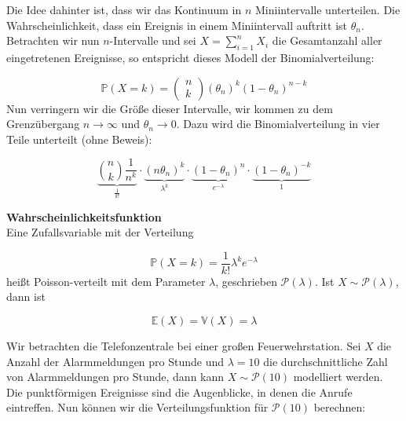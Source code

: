 {    Die Idee dahinter ist, dass wir das
    Kontinuum in $n$ Miniintervalle unterteilen. Die Wahrscheinlichkeit, dass
    ein Ereignis in einem Miniintervall auftritt ist
    $\theta_{n}$. Betrachten wir nun $n$-Intervalle und sei $X=\sum_{i=1}^{n}X_{i}$ 
    die Gesamtanzahl aller eingetretenen Ereignisse, so entspricht dieses Modell der Binomialverteilung:

    \[\mathbb P\left(X=k\right)=
        \left(\begin{matrix}n\\k\end{matrix}\right)\left(\theta_{n}\right)^{k}\left(1-\theta _{n}\right)^{n-k}
    \]
    Nun verringern wir die Größe dieser Intervalle, wir kommen zu dem Grenzübergang $n\rightarrow\infty$ und
    $\theta_{n}\rightarrow0$. Dazu wird die Binomialverteilung in vier Teile unterteilt (ohne Beweis):

    \[\underbrace{\binom{n}{k}\frac{1}{n^k}}_{\frac{1}{k!}}\cdot
        \underbrace{(n\theta_n)^k}_{\lambda^k}\cdot
        \underbrace{(1-\theta_n)^n}_{e^{-\lambda}}\cdot
        \underbrace{(1-\theta_n)^{-k}}_{1}\]

    \begin{definition}\textbf{Wahrscheinlichkeitsfunktion}\\
    Eine Zufallsvariable mit der Verteilung

    \[
    \mathbb P\left(X=k\right)=\frac{1}{k!}\lambda ^{k}e^{-\lambda }
    \]
    heißt Poisson-verteilt mit dem Parameter $\lambda$, geschrieben $\mathcal P\left(\lambda\right)$.
    Ist $X\sim\mathcal P\left(\lambda\right)$, dann ist

    \[\mathbb E\left(X\right)=\mathbb V\left(X\right)=\lambda\]
    \end{definition}

    \begin{bsp}
        Wir betrachten die Telefonzentrale bei einer großen
        Feuerwehrstation. Sei $X$ die Anzahl der Alarmmeldungen pro Stunde und
        $\lambda =10$ die durchschnittliche Zahl von Alarmmeldungen pro Stunde, dann kann
        $X\sim\mathcal P\left(10\right)$ modelliert werden. Die punktförmigen
        Ereignisse sind die Augenblicke, in denen die Anrufe eintreffen. Nun
        können wir die Verteilungsfunktion für $\mathcal P(10)$ berechnen:


\end{bsp}}
